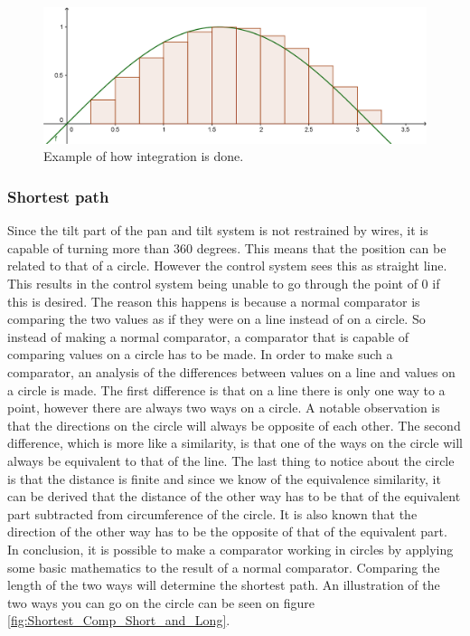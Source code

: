 \begin{figure}[h!]
\centering
\includegraphics[scale=0.4]{Billeder/FPGA/Integration_v1.png}
\caption{Example of how integration is done.}
\label{fig:Integration_v1}
\end{figure}


\subsubsection{Shortest path}

Since the tilt part of the pan and tilt system is not restrained by wires, it is capable of turning more than 360 degrees. This means that the position can be related to that of a circle. However the control system sees this as straight line. This results in the control system being unable to go through the point of 0 if this is desired. The reason this happens is because a normal comparator is comparing the two values as if they were on a line instead of on a circle. So instead of making a normal comparator, a comparator that is capable of comparing values on a circle has to be made.
In order to make such a comparator, an analysis of the differences between values on a line and values on a circle is made. The first difference is that on a line there is only one way to a point, however there are always two ways on a circle. A notable observation is that the directions on the circle will always be opposite of each other.  The second difference, which is more like a similarity, is that one of the ways on the circle will always be equivalent to that of the line. The last thing to notice about the circle is that the distance is finite and since we know of the equivalence similarity, it can be derived that the distance of the other way has to be that of the equivalent part subtracted from circumference of the circle. It is also known that the direction of the other way has to be the opposite of that of the equivalent part. In conclusion, it is possible to make a comparator working in circles by applying some basic mathematics to the result of a normal comparator. Comparing the length of the two ways will determine the shortest path. An illustration of the two ways you can go on the circle can be seen on figure \ref{fig:Shortest_Comp_Short_and_Long}.


